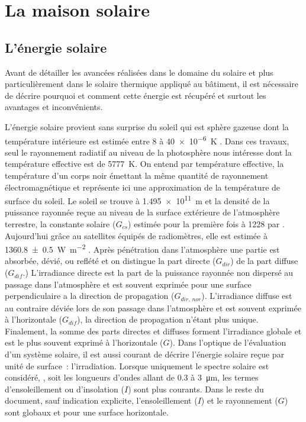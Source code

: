 \section{La maison solaire} %
\label{sec:la_maison_solaire}
\subsection{L’énergie solaire} %
\label{sub:l_energie_solaire}
Avant de détailler les avancées réalisées dans le domaine du solaire et plus particulièrement
dans le solaire thermique appliqué au bâtiment, il est nécessaire de décrire pourquoi
et comment cette énergie est récupéré et surtout les avantages et inconvénients.

L’énergie solaire provient sans surprise du soleil qui est sphère gazeuse
dont  la température intérieure est estimée entre \num{8} à \SI{40e-6}{\kelvin}
\parencite{Duffie1980}. Dans ces travaux, seul le rayonnement radiatif au niveau de la
photosphère nous intéresse dont la température effective est de \SI{5777}{\kelvin}. On
entend par température effective, la température d’un corps noir émettant la même quantité
de rayonnement électromagnétique et représente ici une approximation de la température de
surface du soleil.
Le soleil se trouve à \SI{1.495e11}{\metre} et la densité de la
puissance rayonnée reçue au niveau de la surface extérieure de l’atmosphère terrestre, la
constante solaire ($G_{cs}$) estimée pour la première fois à \num{1228} par .
Aujourd’hui grâce au satellites équipés de radiomètres, elle est estimée
à \SI{1360.8 +- 0.5}{\watt\per\metre\squared} \parencite{Kopp2011}. Après
pénétration dans l’atmosphère une partie est absorbée, dévié, ou reflété et on distingue
la part directe ($G_{dir}$) de la part diffuse ($G_{dif}$.) L’irradiance directe est la part de la puissance
rayonnée non dispersé au passage dans l’atmosphère et est souvent exprimée pour une surface perpendiculaire
a la direction de propagation ($G_{dir,\,nor}$). L’irradiance diffuse est au contraire
déviée lors de son passage dans l’atmosphère et est souvent exprimée à l’horizontale
($G_{dif}$), la direction de propagation n’étant plus unique. Finalement, la somme des
parts directes et diffuses forment l’irradiance globale et est le plus souvent exprimé à
l’horizontale ($G$). Dans l’optique de l’évaluation d’un système solaire, il est
aussi courant de décrire l’énergie solaire reçue par unité de surface~: l’irradiation.
Lorsque uniquement le spectre solaire est considéré,
, soit les longueurs d’ondes allant de \num{0.3} à \SI{3}{\micro\metre}, les termes
d’ensoleillement ou d’insolation ($I$) sont plus courants.
Dans le reste du document, sauf indication explicite, l’ensoleillement ($I$) et le rayonnement ($G$)
sont globaux et pour une surface horizontale.

